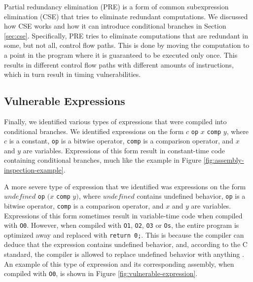 Partial redundancy elimination (PRE) is a form of common subexpression elimination (CSE) that tries to eliminate redundant computations. 
We discussed how CSE works and how it can introduce conditional branches in Section \ref{sec:cse}.
Specifically, PRE tries to eliminate computations that are redundant in some, but not all, control flow paths.
This is done by moving the computation to a point in the program where it is guaranteed to be executed only once.
This results in different control flow paths with different amounts of instructions, which in turn result in timing vulnerabilities.

\subsection{Vulnerable Expressions}
\label{sec:vulnerable-expressions}
Finally, we identified various types of expressions that were compiled into conditional branches.
We identified expressions on the form $c$ \texttt{op} $x$ \texttt{comp} $y$, where $c$ is a constant, \texttt{op} is a bitwise operator, \texttt{comp} is a comparison operator, and $x$ and $y$ are variables.
Expressions of this form result in constant-time code containing conditional branches, much like the example in Figure \ref{fig:assembly-inspection-example}.

A more severe type of expression that we identified was expressions on the form $undefined$ \texttt{op} $(x$ \texttt{comp} $y)$, where $undefined$ contains undefined behavior, \texttt{op} is a bitwise operator, \texttt{comp} is a comparison operator, and $x$ and $y$ are variables. 
Expressions of this form sometimes result in variable-time code when compiled with \texttt{O0}.
However, when compiled with \texttt{O1}, \texttt{O2}, \texttt{O3} or \texttt{Os}, the entire program is optimized away and replaced with \texttt{return 0;}.
This is because the compiler can deduce that the expression contains undefined behavior, and, according to the C standard, the compiler is allowed to replace undefined behavior with anything \citep{c-standard}.
An example of this type of expression and its corresponding assembly, when compiled with \texttt{O0}, is shown in Figure \ref{fig:vulnerable-expression}.

